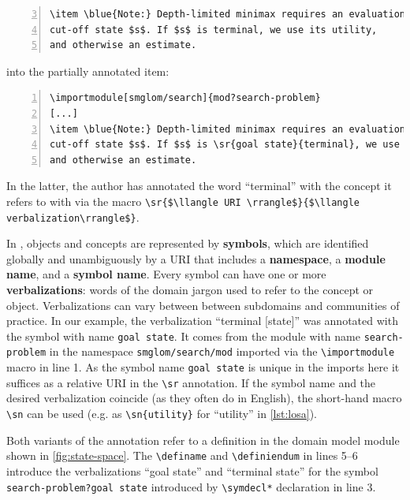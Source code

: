 \documentclass[runningheads]{llncs}
\def\llangle{\langle\kern-.2em\langle}
\def\rrangle{\rangle\kern-.2em\rangle}
\begin{document}
\begin{lstlisting}[numbers=left,firstnumber=3,
caption=The unannotated {\LaTeX} sources of \cref{fig:lo},label=lst:los]
\item \blue{Note:} Depth-limited minimax requires an evaluation for every
cut-off state $s$. If $s$ is terminal, we use its utility,
and otherwise an estimate.
\end{lstlisting}
into the partially annotated item:
\begin{lstlisting}[morekeywords={sr,importmodule},numbers=left,
caption=Annotating ``terminal'' in \cref{lst:los},label=lst:losa]
\importmodule[smglom/search]{mod?search-problem}
[...]
\item \blue{Note:} Depth-limited minimax requires an evaluation for every
cut-off state $s$. If $s$ is \sr{goal state}{terminal}, we use its utility,
and otherwise an estimate.
\end{lstlisting}
In the latter, the author has annotated the word ``terminal'' with the concept it refers
to with via the \sTeX macro
\lstinline[mathescape]|\sr{$\llangle URI \rrangle$}{$\llangle verbalization\rrangle$}|.

In \sTeX, objects and concepts are represented by \textbf{symbols}, which are identified
globally and unambiguously by a URI that includes a \textbf{namespace}, a \textbf{module
  name}, and a \textbf{symbol name}. Every symbol can have one or more
\textbf{verbalizations}: words of the domain jargon used to refer to the concept or
object.  Verbalizations can vary between between subdomains and communities of
practice. In our example, the verbalization ``terminal [state]'' was annotated with the
symbol with name \lstinline|goal state|. It comes from the module with name
\lstinline|search-problem| in the namespace \lstinline|smglom/search/mod| imported via the
\lstinline|\importmodule| macro in line 1. As the symbol name \lstinline|goal state| is
unique in the imports here it suffices as a relative URI in the \lstinline|\sr|
annotation. If the symbol name and the desired verbalization coincide (as they often do in
English), the short-hand macro \lstinline|\sn| can be used (e.g. as
\lstinline|\sn{utility}| for ``utility'' in \cref{lst:losa}).

Both variants of the annotation refer to a definition in the domain model module shown in
\cref{fig:state-space}.  The \lstinline|\definame| and \lstinline|\definiendum| in lines
5--6 introduce the verbalizations ``goal state'' and ``terminal state'' for the symbol
\lstinline|search-problem?goal state| introduced by \lstinline|\symdecl*| declaration in
line 3.
\end{document}
